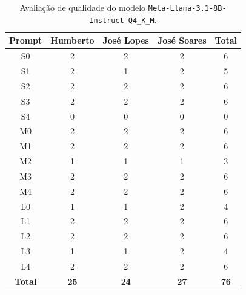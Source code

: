 \begin{table}[H]
    \centering
    \begin{tabular}{|c|c|c|c|c|}
        \hline
        \textbf{Prompt}      &
        \textbf{Humberto}    &
        \textbf{José Lopes}  &
        \textbf{José Soares} &
        \textbf{Total}       \\ \hline

        S0 & 2 & 2 & 2 & 6 \\ \hline
        S1 & 2 & 1 & 2 & 5 \\ \hline
        S2 & 2 & 2 & 2 & 6 \\ \hline
        S3 & 2 & 2 & 2 & 6 \\ \hline
        S4 & 0 & 0 & 0 & 0 \\ \hline
        M0 & 2 & 2 & 2 & 6 \\ \hline
        M1 & 2 & 2 & 2 & 6 \\ \hline
        M2 & 1 & 1 & 1 & 3 \\ \hline
        M3 & 2 & 2 & 2 & 6 \\ \hline
        M4 & 2 & 2 & 2 & 6 \\ \hline
        L0 & 1 & 1 & 2 & 4 \\ \hline
        L1 & 2 & 2 & 2 & 6 \\ \hline
        L2 & 2 & 2 & 2 & 6 \\ \hline
        L3 & 1 & 1 & 2 & 4 \\ \hline
        L4 & 2 & 2 & 2 & 6 \\ \hline

        \textbf{Total} & \textbf{25} & \textbf{24} & \textbf{27} & \textbf{76} \\ \hline
    \end{tabular}
    \caption{Avaliação de qualidade do modelo \texttt{Meta-Llama-3.1-8B-Instruct-Q4\_K\_M}.}
\end{table}


